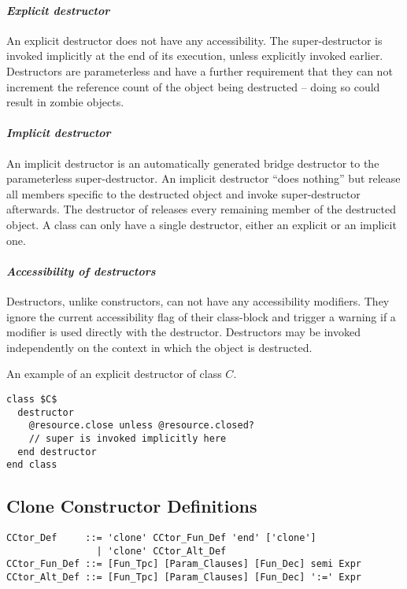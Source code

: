 \paragraph{\em Explicit destructor}
An explicit destructor does not have any accessibility. The super-destructor is invoked implicitly at the end of its execution, unless explicitly invoked earlier. Destructors are parameterless and have a further requirement that they can not increment the reference count of the object being destructed -- doing so could result in zombie objects. 

\paragraph{\em Implicit destructor}
An implicit destructor is an automatically generated bridge destructor to the parameterless super-destructor. An implicit destructor ``does nothing'' but release all members specific to the destructed object and invoke super-destructor afterwards. The destructor of  releases every remaining member of the destructed object. A class can only have a single destructor, either an explicit or an implicit one. 

\paragraph{\em Accessibility of destructors}
Destructors, unlike constructors, can not have any accessibility modifiers. They ignore the current accessibility flag of their class-block and trigger a warning if a modifier is used directly with the destructor. Destructors may be invoked independently on the context in which the object is destructed. 

\example An example of an explicit destructor of class $C$. 
\begin{lstlisting}
class $C$
  destructor
    @resource.close unless @resource.closed?
    // super is invoked implicitly here
  end destructor
end class
\end{lstlisting}

\subsection{Clone Constructor Definitions}
\label{sec:clone-def}

\syntax\begin{lstlisting}
CCtor_Def     ::= 'clone' CCtor_Fun_Def 'end' ['clone']
                | 'clone' CCtor_Alt_Def
CCtor_Fun_Def ::= [Fun_Tpc] [Param_Clauses] [Fun_Dec] semi Expr
CCtor_Alt_Def ::= [Fun_Tpc] [Param_Clauses] [Fun_Dec] ':=' Expr
\end{lstlisting}

